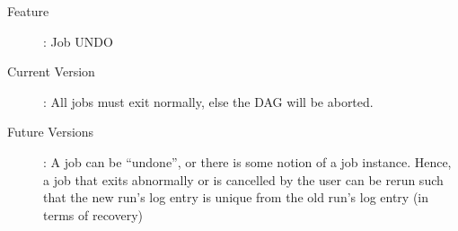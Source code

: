 \begin{description}
\item[Feature]: Job UNDO
\item[Current Version]: All jobs must exit normally, else the DAG will be
aborted.
\item[Future Versions]: A job can be ``undone'', or there is some
notion of a job instance.  Hence, a job that exits abnormally or is
cancelled by the user can be rerun such that the new run's log entry
is unique from the old run's log entry (in terms of recovery)
\end{description}
